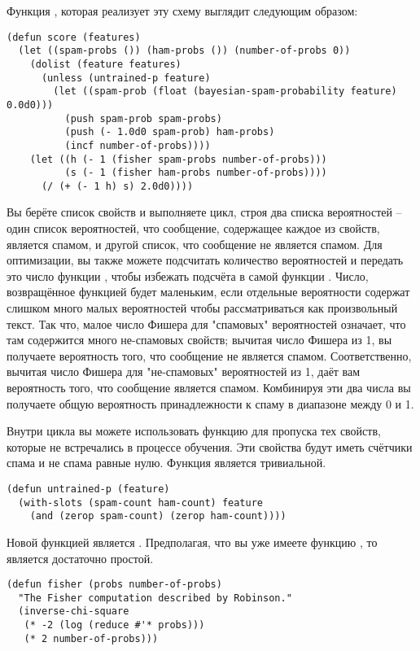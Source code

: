 Функция , которая реализует эту схему выглядит следующим образом:

\begin{lstlisting}
(defun score (features)
  (let ((spam-probs ()) (ham-probs ()) (number-of-probs 0))
    (dolist (feature features)
      (unless (untrained-p feature)
        (let ((spam-prob (float (bayesian-spam-probability feature) 0.0d0)))
          (push spam-prob spam-probs)
          (push (- 1.0d0 spam-prob) ham-probs)
          (incf number-of-probs))))
    (let ((h (- 1 (fisher spam-probs number-of-probs)))
          (s (- 1 (fisher ham-probs number-of-probs))))
      (/ (+ (- 1 h) s) 2.0d0))))
\end{lstlisting}

Вы берёте список свойств и выполняете цикл, строя два списка вероятностей -- один список
вероятностей, что сообщение, содержащее каждое из свойств, является спамом, и другой
список, что сообщение не является спамом.  Для оптимизации, вы также можете подсчитать
количество вероятностей и передать это число функции , чтобы избежать
подсчёта в самой функции .  Число, возвращённое функцией  будет
маленьким, если отдельные вероятности содержат слишком много малых вероятностей чтобы
рассматриваться как произвольный текст.  Так что, малое число Фишера для "спамовых"
вероятностей означает, что там содержится много не-спамовых свойств; вычитая число Фишера
из 1, вы получаете вероятность того, что сообщение не является спамом.  Соответственно,
вычитая число Фишера для "не-спамовых" вероятностей из 1, даёт вам вероятность того, что
сообщение является спамом.  Комбинируя эти два числа вы получаете общую вероятность
принадлежности к спаму в диапазоне между 0 и 1.

Внутри цикла вы можете использовать функцию  для пропуска тех свойств,
которые не встречались в процессе обучения.  Эти свойства будут иметь счётчики спама и не
спама равные нулю.  Функция  является тривиальной.

\begin{lstlisting}
(defun untrained-p (feature)
  (with-slots (spam-count ham-count) feature
    (and (zerop spam-count) (zerop ham-count))))
\end{lstlisting}

Новой функцией является .  Предполагая, что вы уже имеете функцию
, то  является достаточно простой.

\begin{lstlisting}
(defun fisher (probs number-of-probs)
  "The Fisher computation described by Robinson."
  (inverse-chi-square 
   (* -2 (log (reduce #'* probs)))
   (* 2 number-of-probs)))
\end{lstlisting}

